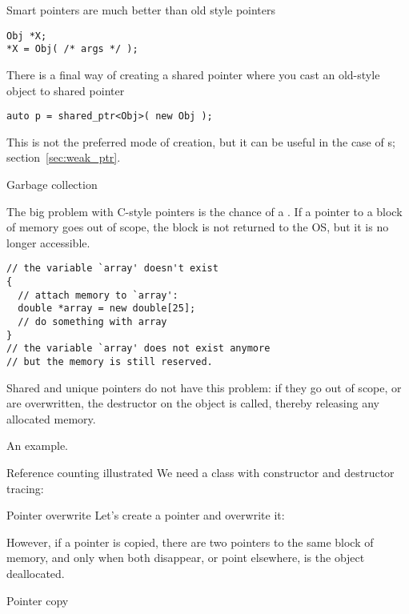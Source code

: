 Smart pointers are much better than old style pointers
\begin{lstlisting}
Obj *X;
*X = Obj( /* args */ );
\end{lstlisting}

There is a final way of creating a shared pointer where you cast an
old-style
 object to shared
pointer
\begin{lstlisting}
auto p = shared_ptr<Obj>( new Obj );
\end{lstlisting}
This is not the preferred mode of creation, but it can be useful in the case of
s; section~\ref{sec:weak_ptr}.

 {Garbage collection}

The big problem with C-style pointers is the chance of a
. If a pointer to a block of memory goes out of
scope, the block is not returned to the \ac{OS}, but it is no longer
accessible.
\begin{lstlisting}
// the variable `array' doesn't exist
{
  // attach memory to `array':
  double *array = new double[25];
  // do something with array
}
// the variable `array' does not exist anymore
// but the memory is still reserved.
\end{lstlisting}
Shared and unique
pointers do not have this problem: if they go out of scope, or are
overwritten, the destructor on the object is called, thereby releasing
any allocated memory.

An example.

\begin{block}{Reference counting illustrated}
  \label{sl:construct-destruct-trace}
  We need a class with constructor and destructor tracing:
\end{block}

\begin{block}{Pointer overwrite}
  \label{sl:shared-ptr-overwrite}
  Let's create a pointer and overwrite it:
\end{block}

However, if a pointer is copied, there are two pointers to the same
block of memory, and only when both disappear, or point elsewhere, is
the object deallocated.

\begin{block}{Pointer copy}
  \label{sl:shared-ptr-copy}
\end{block}

